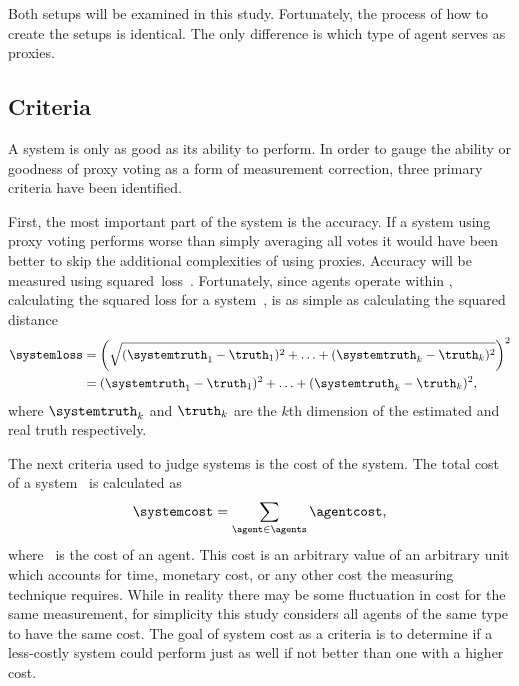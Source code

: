 Both setups will be examined in this study.
Fortunately, the process of how to create the setups is identical.
The only difference is which type of agent serves as proxies.

\subsection{Criteria}\label{subsec:criteria}
A system is only as good as its ability to perform.
In order to gauge the ability or goodness of proxy voting as a form of
measurement correction, three primary criteria have been identified.

First, the most important part of the system is the accuracy.
If a system using proxy voting performs worse than simply averaging all votes
it would have been better to skip the additional complexities of using
proxies.
Accuracy will be measured using squared~loss~\loss.
Fortunately, since agents operate within \systemspace, calculating the
squared loss for a system~\systemloss, is as simple as calculating the
squared distance
\begin{align}
    \systemloss &= {
        \left(\sqrt{
            (\systemtruth_1 - \truth_1)^2 +
            \mathellipsis +
            (\systemtruth_k - \truth_k)^2
        }\right)
    }^2 \nonumber \\
    &= (\systemtruth_1 - \truth_1)^2 +
    \mathellipsis +
    (\systemtruth_k - \truth_k)^2
    \text{,}\label{eq:loss}
\end{align}
where $\systemtruth_k$ and $\truth_k$ are the $k$th
dimension of the estimated and real truth respectively.

The next criteria used to judge systems is the cost of the system.
The total cost of a system \systemcost\ is calculated as
\begin{equation}
    \systemcost =
    \sum_{\agent \in \agents}{
        \agentcost
    }
    \text{,}\label{eq:cost}
\end{equation}
where \agentcost\ is the cost of an agent.
This cost is an arbitrary value of an arbitrary unit which accounts for time,
monetary cost, or any other cost the measuring technique requires.
While in reality there may be some fluctuation in cost for the same
measurement, for simplicity this study considers all agents of the same type
to have the same cost.
The goal of system cost as a criteria is to determine if a less-costly system
could perform just as well if not better than one with a higher cost.

